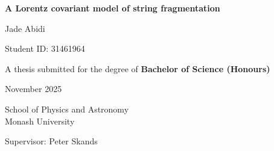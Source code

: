 \documentclass[12pt,a4paper]{report}
\begin{document}
\begin{titlepage}
  \centering
  \vspace*{2cm}
  {\LARGE\bfseries A Lorentz covariant model of string fragmentation \par}
  \vspace{1.5cm}
  \Large Jade Abidi \par
  \vspace{0.5cm}
  \large Student ID: 31461964 \par
  \vspace{0.5cm}
  {\large A thesis submitted for the degree of \bfseries{Bachelor of Science (Honours)}} \par
  \vspace{0.5cm}
  \large November 2025 \par
  \vspace{0.5cm}
  \vfill
  \large School of Physics and Astronomy \\ Monash University \par
  \vspace{0.5cm}
  \large Supervisor: Peter Skands \par
  \vfill
\end{titlepage}

\pagebreak

\begin{abstract}
Monte Carlo event generators are extensively used to simulate high-energy particle-collision events. For analytically intractable aspects, they rely on phenomenological models. The so-called Lund model describes the non-perturbative hadronisation process as the fragmentation of a classical string with constant tension. Lorentz covariance then implies the self-similarity of this fragmentation process along the string. The current formulaion of the Lund model, used in the PYTHIA generator, violates this property in terms of both kinematic distributions and hadronic chemistry. We introduce an additional tunable parameter and a new algorithm for string fragmentation that improve or resolve these issues, albeit with some limitations.
\end{abstract}

\pagebreak

\tableofcontents
\end{document}
